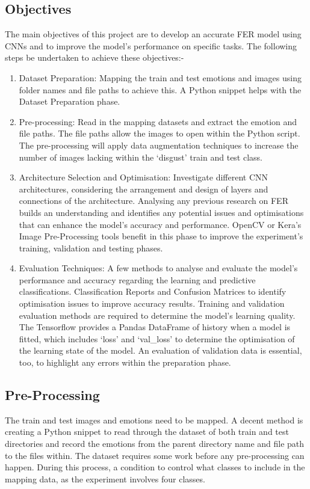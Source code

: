 \documentclass[conference]{IEEEtran}
\begin{document}
      \subsection{Objectives}
        The main objectives of this project are to develop an accurate FER model using CNNs and to improve the model's performance on specific tasks. The following steps be undertaken to achieve these objectives:-

        \begin{enumerate}
          \item Dataset Preparation: Mapping the train and test emotions and images using folder names and file paths to achieve this. A Python snippet helps with the Dataset Preparation phase.
          \item Pre-processing: Read in the mapping datasets and extract the emotion and file paths. The file paths allow the images to open within the Python script. The pre-processing will apply data augmentation techniques to increase the number of images lacking within the `disgust' train and test class.
          \item Architecture Selection and Optimisation: Investigate different CNN architectures, considering the arrangement and design of layers and connections of the architecture. Analysing any previous research on FER builds an understanding and identifies any potential issues and optimisations that can enhance the model's accuracy and performance. OpenCV or Kera's Image Pre-Processing tools benefit in this phase to improve the experiment's training, validation and testing phases.
          \item Evaluation Techniques: A few methods to analyse and evaluate the model's performance and accuracy regarding the learning and predictive classifications. Classification Reports and Confusion Matrices to identify optimisation issues to improve accuracy results. Training and validation evaluation methods are required to determine the model's learning quality. The Tensorflow provides a Pandas DataFrame of history when a model is fitted, which includes `loss' and `val\_loss' to determine the optimisation of the learning state of the model. An evaluation of validation data is essential, too, to highlight any errors within the preparation phase.
        \end{enumerate}

      \subsection{Pre-Processing}
        The train and test images and emotions need to be mapped. A decent method is creating a Python snippet to read through the dataset of both train and test directories and record the emotions from the parent directory name and file path to the files within. The dataset requires some work before any pre-processing can happen. During this process, a condition to control what classes to include in the mapping data, as the experiment involves four classes.
\end{document}
